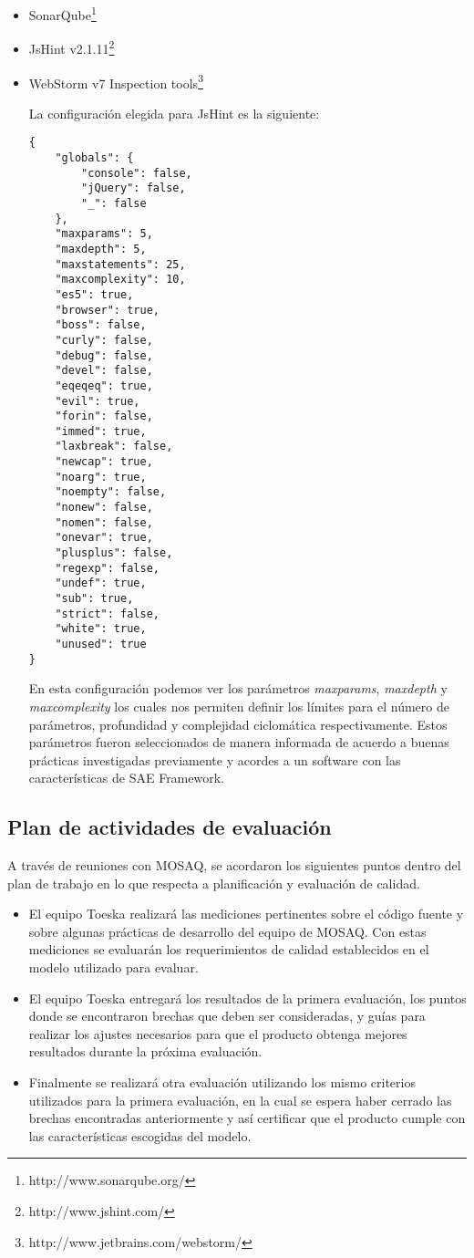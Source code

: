 \begin{itemize}
\item SonarQube\footnote{http://www.sonarqube.org/}
\item JsHint v2.1.11\footnote{http://www.jshint.com/}
\item WebStorm v7 Inspection tools\footnote{http://www.jetbrains.com/webstorm/}


La configuración elegida para JsHint es la siguiente:
\begin{verbatim}
{
    "globals": {
        "console": false,
        "jQuery": false,
        "_": false
    },
    "maxparams": 5,
    "maxdepth": 5,
    "maxstatements": 25,
    "maxcomplexity": 10,
    "es5": true,
    "browser": true,
    "boss": false,
    "curly": false,
    "debug": false,
    "devel": false,
    "eqeqeq": true,
    "evil": true,
    "forin": false,
    "immed": true,
    "laxbreak": false,
    "newcap": true,
    "noarg": true,
    "noempty": false,
    "nonew": false,
    "nomen": false,
    "onevar": true,
    "plusplus": false,
    "regexp": false,
    "undef": true,
    "sub": true,
    "strict": false,
    "white": true,
    "unused": true
}
\end{verbatim}

En esta configuración podemos ver los parámetros \textit{maxparams}, \textit{maxdepth} 
y \textit{maxcomplexity} los cuales nos permiten definir los límites para el número de parámetros,
profundidad y complejidad ciclomática respectivamente. Estos parámetros fueron seleccionados de manera
informada de acuerdo a buenas prácticas investigadas previamente y acordes a un software con las
características de SAE Framework.
\end{itemize}

\subsection{Plan de actividades de evaluación}

A través de reuniones con MOSAQ, se acordaron los siguientes puntos dentro del plan de trabajo en lo
que respecta a planificación y evaluación de calidad.
\begin{itemize}
\item El equipo Toeska realizará las mediciones pertinentes sobre el código fuente y sobre algunas
prácticas de desarrollo del equipo de MOSAQ. Con estas mediciones se evaluarán los requerimientos de
calidad establecidos en el modelo utilizado para evaluar.

\item El equipo Toeska entregará los resultados de la primera evaluación, los puntos donde se encontraron
brechas que deben ser consideradas, y guías para realizar los ajustes necesarios para que el producto
obtenga mejores resultados durante la próxima evaluación.

\item Finalmente se realizará otra evaluación utilizando los mismo criterios utilizados
para la primera evaluación, en la cual se espera haber cerrado las brechas encontradas anteriormente
y así certificar que el producto cumple con las características escogidas del modelo.
\end{itemize}


